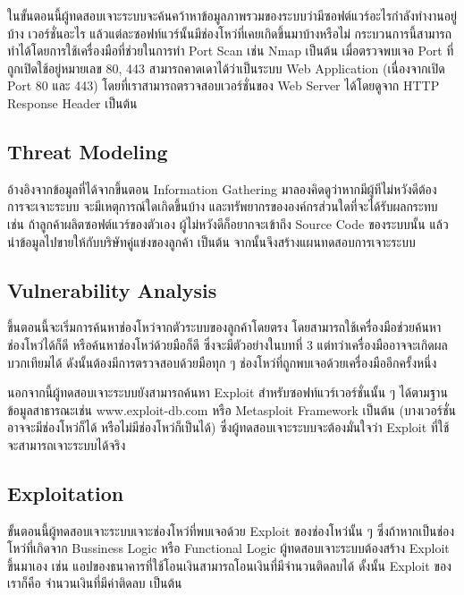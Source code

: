 ในขั้นตอนนี้ผู้ทดสอบเจาะระบบจะค้นคว้าหาข้อมูลภาพรวมของระบบว่ามีซอฟต์แวร์อะไรกำลังทำงานอยู่บ้าง เวอร์ชั่นอะไร แล้วแต่ละซอฟท์แวร์นั้นมีช่องโหว่ที่เคยเกิดขึ้นมาบ้างหรือไม่ กระบวนการนี้สามารถทำได้โดยการใช้เครื่องมือที่ช่วยในการทำ Port Scan\cite{shaw2015nmap} เช่น Nmap\cite{shaw2015nmap} เป็นต้น เมื่อตรวจพบเจอ Port\cite{wiki:port}  ที่ถูกเปิดใช้อยู่หมายเลข 80, 443 สามารถคาดเดาได้ว่าเป็นระบบ Web Application (เนื่องจากเปิด Port 80 และ 443) โดยที่เราสามารถตรวจสอบเวอร์ชั่นของ Web Server ได้โดยดูจาก HTTP Response Header เป็นต้น

\subsection{Threat Modeling}

อ้างอิงจากข้อมูลที่ได้จากขึ้นตอน Information Gathering มาลองคิดดูว่าหากมีผู้ทีไม่หวังดีต้อง
การจะเจาะระบบ จะมีเหตุการณ์ใดเกิดขึ้นบ้าง และทรัพยากรขององค์กรส่วนใดที่จะได้รับผลกระทบ เช่น ถ้าลูกค้าผลิตซอฟต์แวร์ของตัวเอง ผู้ไม่หวังดีก็อยากจะเข้าถึง Source Code ของระบบนั้น แล้วนำข้อมูลไปขายให้กับบริษัทคู่แข่งของลูกค้า เป็นต้น จากนั้นจึงสร้างแผนทดสอบการเจาะระบบ

\subsection{Vulnerability Analysis}

ขึ้นตอนนี้จะเริ่มการค้นหาช่องโหว่จากตัวระบบของลูกค้าโดยตรง โดยสามารถใช้เครื่องมือช่วยค้นหาช่องโหว่ได้ก็ดี หรือค้นหาช่องโหว่ด้วยมือก็ดี ซึ่งจะมีตัวอย่างในบทที่ 3 แต่ทว่าเครื่องมืออาจจะเกิดผลบวกเทียมได้ ดังนั้นต้องมีการตรวจสอบด้วยมือทุก ๆ ช่องโหว่ที่ถูกพบเจอด้วยเครื่องมืออีกครั้งหนึ่ง

นอกจากนี้ผู้ทดสอบเจาะระบบยังสามารถค้นหา Exploit สำหรับซอฟท์แวร์เวอร์ชั่นนั้น ๆ ได้ตามฐานข้อมูลสาธารณะเช่น www.exploit-db.com\cite{wiki:exploitdb}  หรือ Metasploit Framework\cite{wiki:msf} เป็นต้น (บางเวอร์ชั่นอาจจะมีช่องโหว่ก็ได้ หรือไม่มีช่องโหว่ก็เป็นได้) ซึ่งผู้ทดสอบเจาะระบบจะต้องมั่นใจว่า Exploit ที่ใช้จะสามารถเจาะระบบได้จริง

\subsection{Exploitation}

ขั้นตอนนี้ผู้ทดสอบเจาะระบบเจาะช่องโหว่ที่พบเจอด้วย Exploit ของช่องโหว่นั้น ๆ ซึ่งถ้าหากเป็นช่องโหว่ที่เกิดจาก Bussiness Logic หรือ Functional Logic ผู้ทดสอบเจาะระบบต้องสร้าง Exploit ขึ้นมาเอง เช่น แอปของธนาคารที่ใช้โอนเงินสามารถโอนเงินที่มีจำนวนติดลบได้ ดั้งนั้น Exploit ของเราก็คือ จำนวนเงินที่มีค่าติดลบ เป็นต้น 

